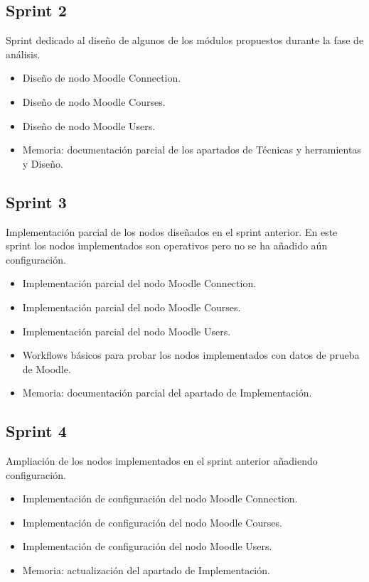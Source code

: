 \subsection{Sprint 2}

Sprint dedicado al diseño de algunos de los módulos propuestos durante la fase de análisis. 

\begin{itemize}
	\item Diseño de nodo Moodle Connection.
	\item Diseño de nodo Moodle Courses.
	\item Diseño de nodo Moodle Users.
	\item Memoria: documentación parcial de los apartados de Técnicas y herramientas y Diseño.
\end{itemize}


\subsection{Sprint 3}

Implementación parcial de los nodos diseñados en el sprint anterior. En este sprint los nodos implementados son operativos 
pero no se ha añadido aún configuración. 

\begin{itemize}
	\item Implementación parcial del nodo Moodle Connection.
	\item Implementación parcial del nodo Moodle Courses.
	\item Implementación parcial del nodo Moodle Users.
	\item Workflows básicos para probar los nodos implementados con datos de prueba de Moodle. 
	\item Memoria: documentación parcial del apartado de Implementación.
\end{itemize}


\subsection{Sprint 4}

Ampliación de los nodos implementados en el sprint anterior añadiendo configuración. 

\begin{itemize}
	\item Implementación de configuración del nodo Moodle Connection.
	\item Implementación de configuración del nodo Moodle Courses.
	\item Implementación de configuración del nodo Moodle Users.
	\item Memoria: actualización del apartado de Implementación. 
\end{itemize}


